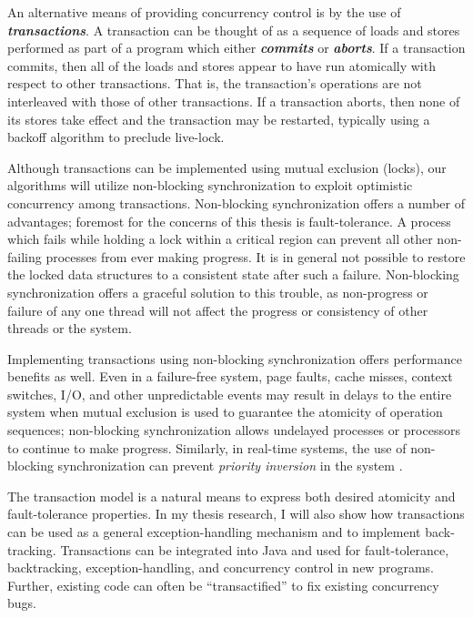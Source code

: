 \documentclass[12pt,twoside]{article}
\newcommand{\defn}[1]           {{\textit{\textbf{\boldmath #1}}}}
\begin{document}
An alternative means of providing concurrency control is by the use of
\defn{transactions}.
A transaction can be thought of as a sequence of loads and stores
performed as part of a program which either
\defn{commits} or \defn{aborts}.  If a transaction
commits, then all of the loads and stores appear to have run
atomically with respect to other transactions.  That is, the
transaction's operations are not interleaved with those of other
transactions.  If a transaction aborts, then none of its stores take
effect and the transaction may be restarted, typically using a
backoff algorithm to preclude live-lock.

Although transactions can be implemented using mutual exclusion
(locks), our algorithms will utilize non-blocking synchronization
\cite{Lamport77,Herlihy88,HerlihyLuMo03,MassalinPu91,GreenwaldCh96} to
exploit optimistic concurrency among transactions.  Non-blocking
synchronization offers a number of advantages; foremost for the
concerns of this thesis is fault-tolerance.  A process which fails
while holding a lock within a critical region can prevent all other
non-failing processes from ever making progress.  It is in general not
possible to restore the locked data structures to a consistent state
after such a failure.  Non-blocking synchronization offers a graceful
solution to this trouble, as non-progress or failure of any one thread
will not affect the progress or consistency of other threads or the
system.

Implementing transactions using
non-blocking synchronization offers performance benefits as well.
Even in a failure-free system, page faults, cache misses, context
switches, I/O, and other unpredictable events may result in delays to the
entire system when mutual exclusion is used to guarantee the atomicity
of operation sequences; non-blocking
synchronization allows undelayed processes or processors to continue
to make progress.
Similarly, in real-time systems, the use of non-blocking
synchronization can prevent \emph{priority inversion} in the system
\cite{Jones97}.

The transaction model is a natural means to express both desired
atomicity and fault-tolerance properties.  In my thesis research, I
will also show how transactions can be used as a general
exception-handling mechanism and to implement back-tracking.
Transactions can be integrated into Java and used for fault-tolerance,
backtracking, exception-handling, and concurrency control in new
programs.  Further, existing code can often be ``transactified'' to
fix existing concurrency bugs.
\end{document}
